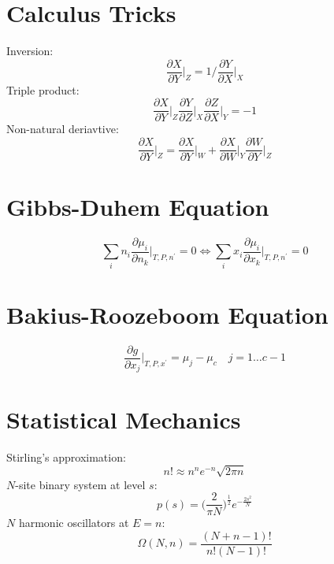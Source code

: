 \documentclass[a4paper,11pt]{article}
\begin{document}
\begin{multicols}{2}
\section{Calculus Tricks}
Inversion:
\begin{equation}
	\frac{\partial X}{\partial Y}\bigg|_Z = 1 / \frac{\partial Y}{\partial X}\bigg|_X
\end{equation}
Triple product:
\begin{equation}
	\frac{\partial X}{\partial Y}\bigg|_Z \frac{\partial Y}{\partial Z}\bigg|_X \frac{\partial Z}{\partial X}\bigg|_Y = -1
\end{equation}
Non-natural deriavtive:
\begin{equation}
	\frac{\partial X}{\partial Y}\bigg|_Z = \frac{\partial X}{\partial Y}\bigg|_W + \frac{\partial X}{\partial W}\bigg|_Y\frac{\partial W}{\partial Y}\bigg|_Z
\end{equation}

\section{Gibbs-Duhem Equation}
\begin{equation}\label{eq:gd-eq}
	\sum_i n_i\frac{\partial \mu_i}{\partial n_k}\bigg|_{T, P, n^\prime} = 0 \iff \sum_i x_i\frac{\partial \mu_i}{\partial x_k}\bigg|_{T, P, n^\prime} = 0 
\end{equation}

\section{Bakius-Roozeboom Equation}
\begin{equation}\label{eq:br-eq}
	\frac{\partial g}{\partial x_j}\bigg|_{T, P, x^\prime} = \mu_j - \mu_c\quad j=1\dots c-1
\end{equation}

\section{Statistical Mechanics}
Stirling's approximation:
\begin{equation}
	n! \approx n^n e^{-n} \sqrt{2\pi n}
\end{equation}
$N$-site binary system at level $s$:
\begin{equation}
	p(s) = \bigg(\frac{2}{\pi N}\bigg)^{\tfrac{1}{2}}e^{-\frac{2s^2}{N}}
\end{equation}
$N$ harmonic oscillators at $E=n$:\\
\begin{equation}
	\Omega (N, n) = \frac{(N+n-1)!}{n!(N-1)!}
\end{equation}

\end{multicols}

\end{document}
